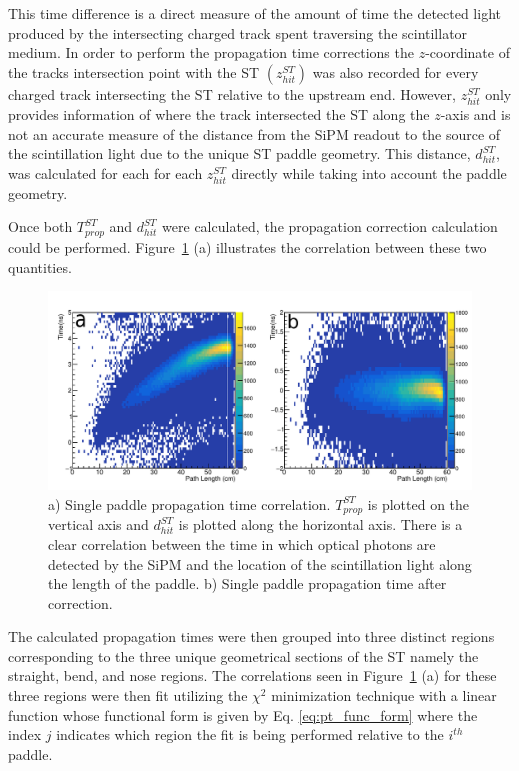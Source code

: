 This time difference is a direct measure of the amount of time the detected light produced by the intersecting charged track spent traversing the scintillator medium.  In order to perform the propagation time corrections the $z$-coordinate of the tracks intersection point with the ST $(z^{ST}_{hit})$ was also recorded for every charged track intersecting the ST relative to the upstream end.  However, $z^{ST}_{hit}$ only provides information of where the track intersected the ST along the $z$-axis and is not an accurate measure of the distance from the SiPM readout to the source of the scintillation light due to the unique ST paddle geometry.  This distance, $d^{ST}_{hit}$, was calculated for each for each $z^{ST}_{hit}$ directly while taking into account the paddle geometry. 

Once both $T^{ST}_{prop}$ and $d^{ST}_{hit}$ were calculated, the propagation correction calculation could be performed.  Figure~\ref{fig:proptimeuncorr} (a) illustrates the correlation between these two quantities.
	\begin{figure}[!htb]
		\centering
		\includegraphics[width=1.0\textwidth]{calibration/figs/drawing}
		\caption{a) Single paddle propagation time correlation.  $T^{ST}_{prop}$ is plotted on the vertical axis and $d^{ST}_{hit}$ is plotted along the horizontal axis. There is a clear correlation between the time in which optical photons are detected by the SiPM and the location of the scintillation light along the length of the paddle. b) Single paddle propagation time after correction.}
		\label{fig:proptimeuncorr}
	\end{figure}
The calculated propagation times were then grouped into three distinct regions corresponding to the three unique geometrical sections of the ST namely the straight, bend, and nose regions.  The correlations seen in Figure~\ref{fig:proptimeuncorr} (a) for these three regions were then fit utilizing the $\chi^{2}$ minimization technique with a linear function whose functional form is given by Eq. \ref{eq:pt_func_form} where the index $j$ indicates which region the fit is being performed relative to the $i^{th}$ paddle.
